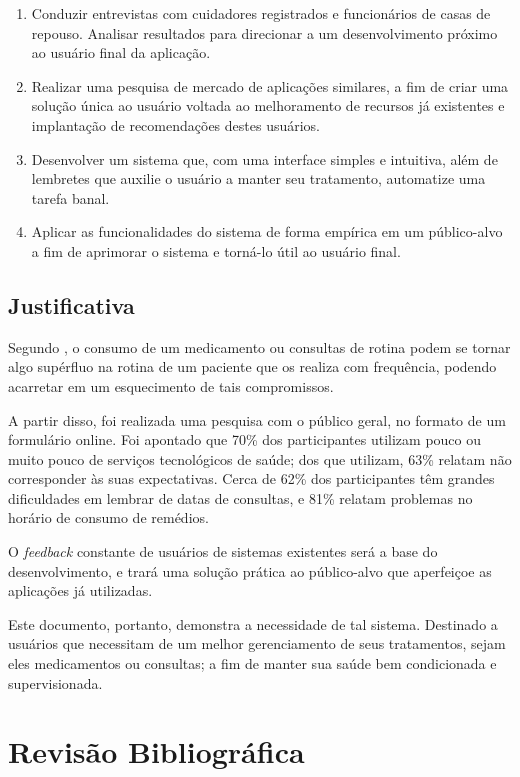 \documentclass[
	article,			%
	12pt,				%
	oneside,			%
	a4paper,			%
    BIBLATEX,           %
	english,			%
	brazil,				%
	sumario=tradicional
	]{abntex2}
\begin{document}
\begin{enumerate}
    \item Conduzir entrevistas com cuidadores registrados e funcionários de casas de repouso. Analisar resultados para direcionar a um desenvolvimento próximo ao usuário final da aplicação.
    \item Realizar uma pesquisa de mercado de aplicações similares, a fim de criar uma solução única ao usuário voltada ao melhoramento de recursos já existentes e implantação de recomendações destes usuários. 
    \item Desenvolver um sistema que, com uma interface simples e intuitiva, além de lembretes que auxilie o usuário a manter seu tratamento, automatize uma tarefa banal.
    \item Aplicar as funcionalidades do sistema de forma empírica em um público-alvo a fim de aprimorar o sistema e torná-lo útil ao usuário final.
\end{enumerate}


\subsection{Justificativa}    

Segundo , o consumo de um medicamento ou consultas de rotina podem se tornar algo supérfluo na rotina de um paciente que os realiza com frequência, podendo acarretar em um esquecimento de tais compromissos. 

A partir disso, foi realizada uma pesquisa com o público geral, no formato de um formulário online. Foi apontado que 70\% dos participantes utilizam pouco ou muito pouco de serviços tecnológicos de saúde; dos que utilizam, 63\% relatam não corresponder às suas expectativas. Cerca de 62\% dos participantes têm grandes dificuldades em lembrar de datas de consultas, e 81\% relatam problemas no horário de consumo de remédios.

O \textit{feedback} constante de usuários de sistemas existentes será a base do desenvolvimento, e trará uma solução prática ao público-alvo que aperfeiçoe as aplicações já utilizadas.

Este documento, portanto, demonstra a necessidade de tal sistema. Destinado a usuários que necessitam de um melhor gerenciamento de seus tratamentos, sejam eles medicamentos ou consultas; a fim de manter sua saúde bem condicionada e supervisionada.

\section{Revisão Bibliográfica}
\end{document}
